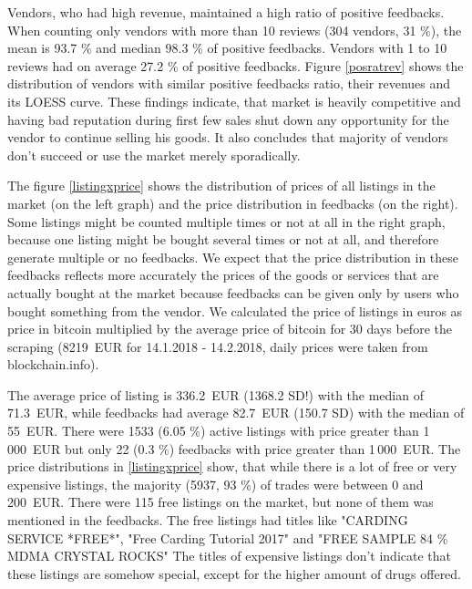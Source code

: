 \documentclass[
  digital, %
  table,   %
  lof,     %
  lot,     %
  oneside
]{fithesis3}
\begin{document}
Vendors, who had high revenue, maintained a high ratio of positive feedbacks.
When counting only vendors with more than 10 reviews (304 vendors, 31 \%),
the mean is 93.7 \% and median 98.3 \% of positive feedbacks.
Vendors with 1 to 10 reviews had on average 27.2 \% of positive feedbacks.
Figure \ref{posratrev} shows the distribution of vendors with similar
positive feedbacks ratio, their revenues and its LOESS curve.
These findings indicate, that market is heavily competitive and
having bad reputation during first few sales shut down any opportunity
for the vendor to continue selling his goods. It also concludes that majority of vendors don't succeed or use
the market merely sporadically.

The figure \ref{listingxprice} shows the distribution of prices of all listings in
 the market (on the left graph) and the price distribution in feedbacks (on the right).
 Some listings might be counted multiple times or not at all in the right graph, because one listing might be bought several times or not at all, and therefore generate multiple or no feedbacks. We expect that the price distribution in these feedbacks reflects more accurately the prices of the goods or services
 that are actually bought at the market because feedbacks can be given only by users who
 bought something from the vendor. We calculated the price of listings in euros as 
 price in bitcoin multiplied by the average price of bitcoin for 30 days before the scraping
 (8219~EUR for 14.1.2018 - 14.2.2018, daily prices were taken from blockchain.info).
 
 The average price of listing is 336.2~EUR (1368.2 SD!) with the median of 71.3~EUR,
 while feedbacks had average 82.7~EUR (150.7 SD) with the median of 55~EUR.
  There were 1533 (6.05 \%) active listings with price greater than 1\,000~EUR but 
  only 22 (0.3 \%) feedbacks with price greater than 1\,000~EUR.
 The price distributions in \ref{listingxprice} show,
 that while there is a lot of free or very expensive listings,
 the majority (5937, 93 \%) of trades were between 0 and 200~EUR.
 There were 115 free listings on the market,
 but none of them was mentioned in the feedbacks.
 The free listings had titles like "CARDING SERVICE *FREE*",
  "Free Carding Tutorial 2017" and "FREE SAMPLE 84 \% MDMA CRYSTAL ROCKS"
 The titles of expensive listings don't indicate that 
these listings are somehow special, except for the higher amount of drugs offered.
\end{document}
